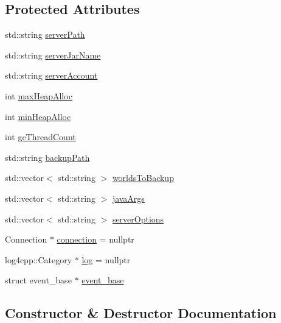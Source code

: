\subsection*{Protected Attributes}
\begin{DoxyCompactItemize}
\item 
std\+::string \hyperlink{class_server_a3435a7c091cb1184892e0a8a89838aa8}{server\+Path}
\item 
std\+::string \hyperlink{class_server_a00fa649de7a3b16e3884e7f0edb01cbc}{server\+Jar\+Name}
\item 
std\+::string \hyperlink{class_server_a1e9675de0f07622b12fa6848bc2d24b2}{server\+Account}
\item 
int \hyperlink{class_server_af2edab4046d3ca9525dc117582b1efa5}{max\+Heap\+Alloc}
\item 
int \hyperlink{class_server_ab572c4b5477a4dcfdf264e9fcb5b9f82}{min\+Heap\+Alloc}
\item 
int \hyperlink{class_server_a3586f498f31d9b52f122b48dff5bebb8}{gc\+Thread\+Count}
\item 
std\+::string \hyperlink{class_server_a5519da36a05003e5b724f6c0ae6a80a0}{backup\+Path}
\item 
std\+::vector$<$ std\+::string $>$ \hyperlink{class_server_ac0981101c974ac4173f98c3d2b9adc20}{worlds\+To\+Backup}
\item 
std\+::vector$<$ std\+::string $>$ \hyperlink{class_server_a97edc18388a8b8c94193dabfdadcf389}{java\+Args}
\item 
std\+::vector$<$ std\+::string $>$ \hyperlink{class_server_a955aa6e6e4f11b3809db65a16f16f14e}{server\+Options}
\item 
Connection $\ast$ \hyperlink{class_server_a3e056084670831acaff47913ac9e87cd}{connection} = nullptr
\item 
log4cpp\+::\+Category $\ast$ \hyperlink{class_server_a94a7ba28c6d4348929055cc28886db28}{log} = nullptr
\item 
struct event\+\_\+base $\ast$ \hyperlink{class_server_afd7e0781dcfb8315807e3b173f84d8a9}{event\+\_\+base}
\end{DoxyCompactItemize}


\subsection{Constructor \& Destructor Documentation}
